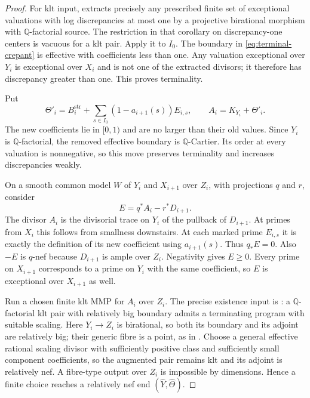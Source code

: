 \begin{proof}
For klt input, \cite[Corollary~1.4.3]{BCHM} extracts precisely any prescribed finite set of exceptional valuations with log discrepancies at most one by a projective birational morphism with $\mathbb Q$-factorial source. The restriction in that corollary on discrepancy-one centers is vacuous for a klt pair. Apply it to $I_0$. The boundary in \eqref{eq:terminal-crepant} is effective with coefficients less than one. Any valuation exceptional over $Y_i$ is exceptional over $X_i$ and is not one of the extracted divisors; it therefore has discrepancy greater than one. This proves terminality.

Put
\[
 \Theta'_i=B_i^{\mathrm{str}}+
       \sum_{s\in I_0}(1-a_{i+1}(s))E_{i,s},
 \qquad A_i=K_{Y_i}+\Theta'_i.
\]
The new coefficients lie in $[0,1)$ and are no larger than their old values. Since $Y_i$ is $\mathbb Q$-factorial, the removed effective boundary is $\mathbb Q$-Cartier. Its order at every valuation is nonnegative, so this move preserves terminality and increases discrepancies weakly.

On a smooth common model $W$ of $Y_i$ and $X_{i+1}$ over $Z_i$, with projections $q$ and $r$, consider
\[
 E=q^*A_i-r^*D_{i+1}.
\]
The divisor $A_i$ is the divisorial trace on $Y_i$ of the pullback of $D_{i+1}$. At primes from $X_i$ this follows from smallness downstairs. At each marked prime $E_{i,s}$ it is exactly the definition of its new coefficient using $a_{i+1}(s)$. Thus $q_*E=0$. Also $-E$ is $q$-nef because $D_{i+1}$ is ample over $Z_i$. Negativity gives $E\geq0$. Every prime on $X_{i+1}$ corresponds to a prime on $Y_i$ with the same coefficient, so $E$ is exceptional over $X_{i+1}$ as well.

Run a chosen finite klt MMP for $A_i$ over $Z_i$. The precise existence input is \cite[Theorem~1.2 and Corollary~1.4.2]{BCHM}: a $\mathbb Q$-factorial klt pair with relatively big boundary admits a terminating program with suitable scaling. Here $Y_i\to Z_i$ is birational, so both its boundary and its adjoint are relatively big; their generic fibre is a point, as in \cite[Definition~3.1.1(7)]{BCHM}. Choose a general effective rational scaling divisor with sufficiently positive class and sufficiently small component coefficients, so the augmented pair remains klt and its adjoint is relatively nef. A fibre-type output over $Z_i$ is impossible by dimensions. Hence a finite choice reaches a relatively nef end $(\widehat Y,\widehat\Theta)$.


\end{proof}
